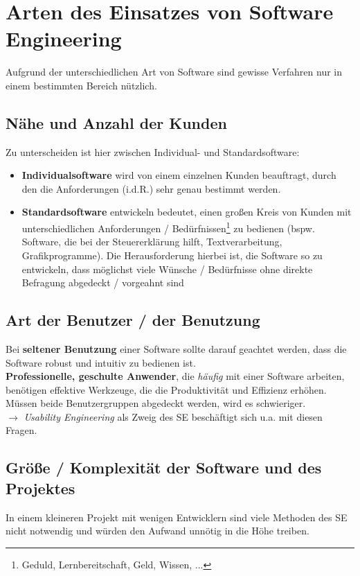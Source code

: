 \section{Arten des Einsatzes von Software Engineering}
Aufgrund der unterschiedlichen Art von Software sind gewisse Verfahren nur in einem bestimmten Bereich nützlich.

\subsection{Nähe und Anzahl der Kunden}
Zu unterscheiden ist hier zwischen Individual- und Standardsoftware:

\begin{itemize}
    \item \textbf{Individualsoftware} wird von einem einzelnen Kunden beauftragt, durch den die Anforderungen (i.d.R.) sehr genau bestimmt werden.
    \item \textbf{Standardsoftware} entwickeln bedeutet, einen großen Kreis von Kunden mit unterschiedlichen Anforderungen / Bedürfnissen\footnote{Geduld, Lernbereitschaft, Geld, Wissen, ...} zu bedienen (bspw. Software, die bei der Steuererklärung hilft, Textverarbeitung, Grafikprogramme).
    Die Herausforderung hierbei ist, die Software so zu entwickeln, dass möglichst viele Wünsche / Bedürfnisse ohne direkte Befragung abgedeckt / vorgeahnt sind
\end{itemize}

\subsection{Art der Benutzer / der Benutzung}
Bei \textbf{seltener Benutzung} einer Software sollte darauf geachtet werden, dass die Software robust und intuitiv zu bedienen ist.\\

\noindent
\textbf{Professionelle, geschulte Anwender}, die \textit{häufig} mit einer Software arbeiten, benötigen effektive Werkzeuge, die die Produktivität und Effizienz erhöhen.\\

\noindent
Müssen beide Benutzergruppen abgedeckt werden, wird es schwieriger.\\

\noindent
$\rightarrow$ \textit{Usability Engineering} als Zweig des SE beschäftigt sich u.a. mit diesen Fragen.

\subsection{Größe / Komplexität der Software und des Projektes}
In einem kleineren Projekt mit wenigen Entwicklern sind viele Methoden des SE nicht notwendig und würden den Aufwand unnötig in die Höhe treiben.\\

